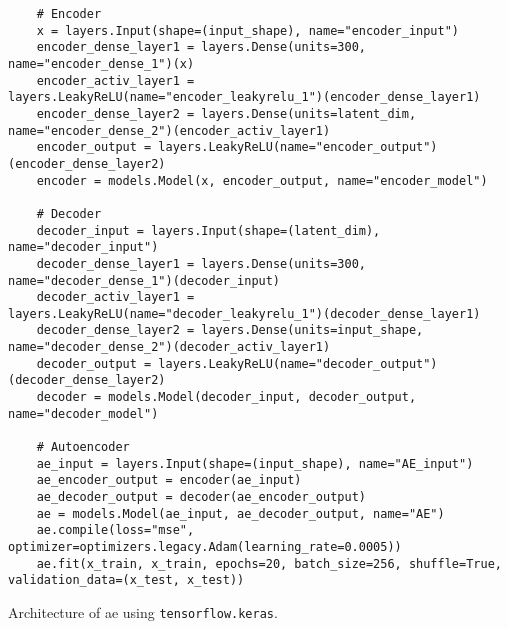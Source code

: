 \begin{listing}[htp]
    \begin{verbatim}
    # Encoder
    x = layers.Input(shape=(input_shape), name="encoder_input")
    encoder_dense_layer1 = layers.Dense(units=300, name="encoder_dense_1")(x)
    encoder_activ_layer1 = layers.LeakyReLU(name="encoder_leakyrelu_1")(encoder_dense_layer1)
    encoder_dense_layer2 = layers.Dense(units=latent_dim, name="encoder_dense_2")(encoder_activ_layer1)
    encoder_output = layers.LeakyReLU(name="encoder_output")(encoder_dense_layer2)
    encoder = models.Model(x, encoder_output, name="encoder_model")

    # Decoder
    decoder_input = layers.Input(shape=(latent_dim), name="decoder_input")
    decoder_dense_layer1 = layers.Dense(units=300, name="decoder_dense_1")(decoder_input)
    decoder_activ_layer1 = layers.LeakyReLU(name="decoder_leakyrelu_1")(decoder_dense_layer1)
    decoder_dense_layer2 = layers.Dense(units=input_shape, name="decoder_dense_2")(decoder_activ_layer1)
    decoder_output = layers.LeakyReLU(name="decoder_output")(decoder_dense_layer2)
    decoder = models.Model(decoder_input, decoder_output, name="decoder_model")

    # Autoencoder
    ae_input = layers.Input(shape=(input_shape), name="AE_input")
    ae_encoder_output = encoder(ae_input)
    ae_decoder_output = decoder(ae_encoder_output)
    ae = models.Model(ae_input, ae_decoder_output, name="AE")
    ae.compile(loss="mse", optimizer=optimizers.legacy.Adam(learning_rate=0.0005))
    ae.fit(x_train, x_train, epochs=20, batch_size=256, shuffle=True, validation_data=(x_test, x_test))
    \end{verbatim}
    \caption{Architecture of \ac{ae} using \texttt{tensorflow.keras}. 
    }
    \label{lst:impl_ae}
\end{listing}